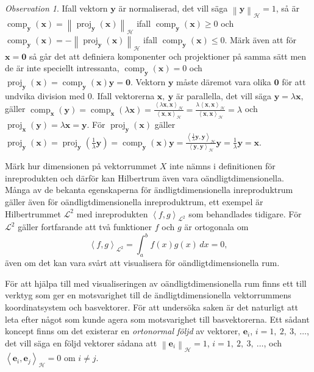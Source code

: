 \documentclass[a4paper, 12pt]{report}
\theoremstyle{definition}
\theoremstyle{remark}
\newtheorem*{rem}{Observation}
\newcommand{\bfx}{\mathbf{x}}
\newcommand{\bfy}{\mathbf{y}}
\newcommand{\llangle}{\left\langle}
\newcommand{\rrangle}{\right\rangle}
\newcommand{\inner}[2]{\llangle #1, #2 \rrangle}
\newcommand{\hil}{\mathcal{H}}
\begin{document}
\begin{rem}
	Ifall vektorn $\bfy$ är normaliserad, det vill säga $\left\|\bfy\right\|_\hil=1$, så är $\operatorname{comp}_\bfy\!\left(\bfx\right)=\left\|\operatorname{proj}_\bfy\!\left(\bfx\right)\right\|_\hil$ ifall $\operatorname{comp}_\bfy\!\left(\bfx\right)\geq0$ och $\operatorname{comp}_\bfy\!\left(\bfx\right)=-\!\left\|\operatorname{proj}_\bfy\!\left(\bfx\right)\right\|_\hil$ ifall $\operatorname{comp}_\bfy\left(\bfx\right)\leq0$.
	Märk även att för $\bfx=\mathbf{0}$ så går det att definiera komponenter och projektioner på samma sätt men de är inte speciellt intressanta, $\operatorname{comp}_\bfy\left(\bfx\right)=0$ och $\operatorname{proj}_\bfy\left(\bfx\right)=\operatorname{comp}_\bfy\left(\bfx\right)\bfy=\mathbf{0}$.
	Vektorn $\bfy$ måste däremot vara olika $\mathbf{0}$ för att undvika division med 0.
	Ifall vektorerna $\bfx,~\bfy$ är parallella, det vill säga $\bfy=\lambda\bfx$, gäller $\operatorname{comp}_\bfx\left(\bfy\right) = \operatorname{comp}_\bfx\left(\lambda\bfx\right) = \frac{\inner{\lambda \bfx}{\bfx}_\hil}{\inner{\bfx}{\bfx}_\hil} = \frac{\lambda \inner{\bfx}{\bfx}_\hil}{\inner{\bfx}{\bfx}_\hil}=\lambda$ och $\operatorname{proj}_\bfx\left(\bfy\right)=\lambda\bfx=\bfy$. För $\operatorname{proj}_\bfy\left(\bfx\right)$ gäller $\operatorname{proj}_\bfy\left(\bfx\right) = \operatorname{proj}_\bfy\left(\frac{1}{\lambda}\bfy\right)=\operatorname{comp}_\bfy\left(\bfx\right)\bfy = \frac{\inner{\frac{1}{\lambda}\bfy}{\bfy}_\hil}{\inner{\bfy}{\bfy}_\hil}\bfy= \frac{1}{\lambda}\bfy=\bfx$.
\end{rem}

Märk hur dimensionen på vektorrummet $X$ inte nämns i definitionen för inreprodukten och därför kan Hilbertrum även vara oändligtdimensionella. Många av de bekanta egenskaperna för ändligtdimensionella inreproduktrum gäller även för oändligtdimensionella inreproduktrum, ett exempel är Hilbertrummet $\mathcal{L}^2$ med inreprodukten $\inner{f}{g}_{\mathcal{L}^2}$ som behandlades tidigare. För $\mathcal{L}^2$ gäller fortfarande att två funktioner $f$ och $g$ är ortogonala om
\begin{equation*}
	\inner{f}{g}_{\mathcal{L}^2}=\int_{a}^{b}f(x)g(x) \, dx=0,
\end{equation*}
även om det kan vara svårt att visualisera för oändligtdimensionella rum.

För att hjälpa till med visualiseringen av oändligtdimensionella rum finns ett till verktyg som ger en motsvarighet till de ändligtdimensionella vektorrummens koordinatsystem och basvektorer. För att undersöka saken är det naturligt att leta efter något som kunde agera som motsvarighet till basvektorerna. Ett sådant koncept finns om det existerar en \emph{ortonormal följd} av vektorer, $\mathbf{e}_i$, $i=1,~2,~3,~\dots$, det vill säga en följd vektorer sådana att $\left\|\mathbf{e}_i\right\|_\hil=1$, $i=1,~2,~3,~\dots$, och $\inner{\mathbf{e}_i}{\mathbf{e}_j}_\hil=0$ om $i\neq j$.
\end{document}
